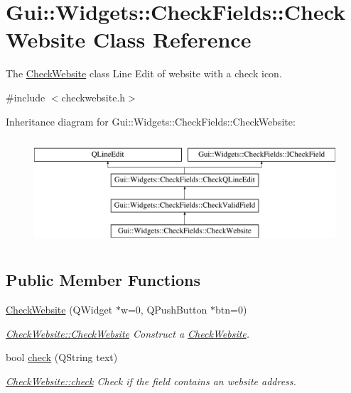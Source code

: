 \hypertarget{classGui_1_1Widgets_1_1CheckFields_1_1CheckWebsite}{\section{Gui\-:\-:Widgets\-:\-:Check\-Fields\-:\-:Check\-Website Class Reference}
\label{classGui_1_1Widgets_1_1CheckFields_1_1CheckWebsite}
}


The \hyperlink{classGui_1_1Widgets_1_1CheckFields_1_1CheckWebsite}{Check\-Website} class Line Edit of website with a check icon.  




{\ttfamily \#include $<$checkwebsite.\-h$>$}

Inheritance diagram for Gui\-:\-:Widgets\-:\-:Check\-Fields\-:\-:Check\-Website\-:\begin{figure}[H]
\begin{center}
\leavevmode
\includegraphics[height=4.000000cm]{dd/d1b/classGui_1_1Widgets_1_1CheckFields_1_1CheckWebsite}
\end{center}
\end{figure}
\subsection*{Public Member Functions}
\begin{DoxyCompactItemize}
\item 
\hyperlink{classGui_1_1Widgets_1_1CheckFields_1_1CheckWebsite_a9b4c5bef960d5e3d3972d6dc9c10f7cc}{Check\-Website} (Q\-Widget $\ast$w=0, Q\-Push\-Button $\ast$btn=0)
\begin{DoxyCompactList}\small\item\em \hyperlink{classGui_1_1Widgets_1_1CheckFields_1_1CheckWebsite_a9b4c5bef960d5e3d3972d6dc9c10f7cc}{Check\-Website\-::\-Check\-Website} Construct a \hyperlink{classGui_1_1Widgets_1_1CheckFields_1_1CheckWebsite}{Check\-Website}. \end{DoxyCompactList}\item 
bool \hyperlink{classGui_1_1Widgets_1_1CheckFields_1_1CheckWebsite_ad2f5e53b88ca8740fd248dcaab0439bd}{check} (Q\-String text)
\begin{DoxyCompactList}\small\item\em \hyperlink{classGui_1_1Widgets_1_1CheckFields_1_1CheckWebsite_ad2f5e53b88ca8740fd248dcaab0439bd}{Check\-Website\-::check} Check if the field contains an website address. \end{DoxyCompactList}\end{DoxyCompactItemize}
